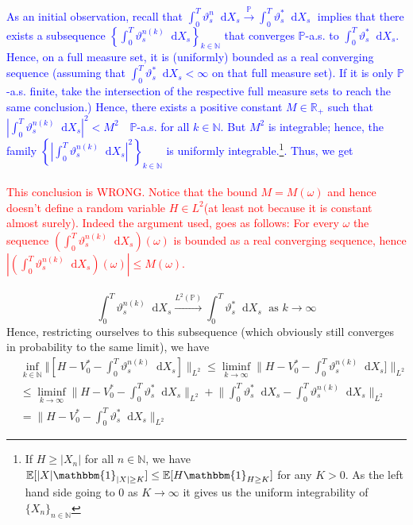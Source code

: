 \documentclass[11pt]{report}
\newcommand{\diff}{\mathop{}\!\mathrm{d}}
\theoremstyle{plain} %
\theoremstyle{definition} %
\theoremstyle{remark} %
\begin{document}
\textcolor{blue}{As an initial observation, recall that \(\int_{0}^T\vartheta_s^n\diff X_s\xrightarrow{\mathbb{P}}\int_{0}^T\vartheta^*_s\diff X_s\;\) implies that there exists a subsequence \(\left\{\int_{0}^T\vartheta_s^{n(k)}\diff X_s\right\}_{k\in\mathbb{N}}\) that converges \(\mathbb{P}\)-a.s. to \(\int_{0}^T\vartheta_s^{*}\diff X_s\). Hence, on a full measure set, it is (uniformly) bounded as a real converging sequence (assuming that \(\int_{0}^T\vartheta_s^{*}\diff X_s<\infty\) on that full measure set). If it is only \(\mathbb{P}\)-a.s. finite, take the intersection of the respective full measure sets to reach the same conclusion.) Hence, there exists a positive constant \(M\in\mathbb{R}_+\) such that \(\left|\int_{0}^T\vartheta_s^{n(k)}\diff X_s\right|^2<M^2\quad \mathbb{P}\)-a.s. for all \(k\in\mathbb{N}\). But \(M^2\) is integrable; hence, the family \(\left\{\left|\int_{0}^T\vartheta_s^{n(k)}\diff X_s\right|^2\right\}_{k\in\mathbb{N}}\) is uniformly integrable.\footnote{If \(H\geq |X_n|\) for all \(n\in\mathbb{N}\), we have \(\mathbb{E}[|X|\mathbbm{1}_{|X|\geq K}]\leq\mathbb{E}[H\mathbbm{1}_{H\geq K}]\) for any \(K>0\). As the left hand side going to 0 as \(K\to\infty\) it gives us the uniform integrability of \(\{X_n\}_{n\in\mathbb{N}}\)}. Thus, we get }
\\\\
\textcolor{red}{This conclusion is WRONG. Notice that the bound \(M = M(\omega)\) and hence doesn't define a random variable \(H\in L^2\)(at least not because it is constant almost surely). Indeed the argument used, goes as follows: For every \(\omega\) the sequence \(\left(\int_{0}^T\vartheta_s^{n(k)}\diff X_s\right)(\omega)\) is bounded as a real converging sequence, hence \(\left|\left(\int_{0}^T\vartheta_s^{n(k)}\diff X_s\right)(\omega)\right|\leq M(\omega)\).}
\\\\
\begin{equation}
\int_{0}^T\vartheta_s^{n(k)}\diff X_s \xrightarrow{L^2(\mathbb{P})} \int_{0}^T\vartheta^*_s\diff X_s\;\text{ as } k\to\infty
\end{equation}
Hence, restricting ourselves to this subsequence (which obviously still converges in probability to the same limit), we have 
\begin{align*}
    &\inf_{k\in\mathbb{N}}\Vert[H-V_0^*-\int_{0}^T\vartheta_s^{n(k)}\diff X_s]\rVert_{L^2}\leq \liminf_{k\to\infty}\lVert H-V_0^*-\int_{0}^T\vartheta_s^{n(k)}\diff X_s]\rVert_{L^2}\\&\leq \liminf_{k\to\infty}\lVert H-V_0^*-\int_{0}^T\vartheta_s^{*}\diff X_s\rVert_{L^2}+\lVert \int_{0}^T\vartheta_s^{*}\diff X_s -\int_{0}^T\vartheta_s^{n(k)}\diff X_s\rVert_{L^2}
    \\&=\lVert H-V_0^*-\int_{0}^T\vartheta_s^{*}\diff X_s\rVert_{L^2}
\end{align*}
\end{document}
